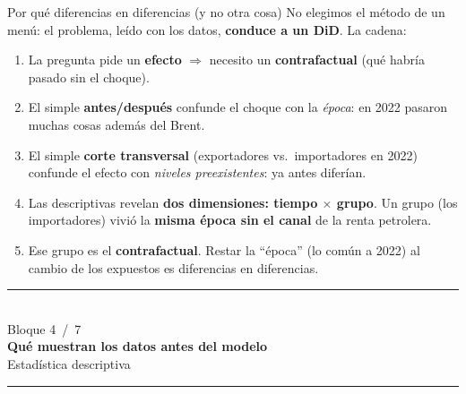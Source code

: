 \documentclass[aspectratio=169,10pt]{beamer}
\newcommand{\key}[1]{{\bfseries\color{AcentoRojo}#1}}
\newcommand{\divisor}[3]{%
  {\setbeamertemplate{footline}{}%
   \begin{frame}[plain]
     \vfill
     \begin{center}
       {\color{AcentoRojo}\rule{2.6cm}{1.2pt}}\\[0.7em]
       {\scriptsize\color{GrisMedio}Bloque #1 \,/\, 7}\\[0.6em]
       {\Large\color{Carbon}\bfseries #2}\\[0.45em]
       {\color{GrisMedio}#3}\\[0.7em]
       {\color{AcentoRojo}\rule{2.6cm}{1.2pt}}
     \end{center}
     \vfill
   \end{frame}}}
\begin{document}
\begin{frame}{Por qué diferencias en diferencias (y no otra cosa)}
  \small
  No elegimos el método de un menú: el problema, leído con los datos, \textbf{conduce a un DiD}.
  La cadena:
  \begin{enumerate}
    \item La pregunta pide un \textbf{efecto} $\Rightarrow$ necesito un \textbf{contrafactual}
          (qué habría pasado sin el choque).
    \item El simple \textbf{antes/después} confunde el choque con la \emph{época}: en 2022 pasaron
          muchas cosas además del Brent.
    \item El simple \textbf{corte transversal} (exportadores vs.\ importadores en 2022) confunde el
          efecto con \emph{niveles preexistentes}: ya antes diferían.
    \item Las descriptivas revelan \key{dos dimensiones: tiempo $\times$ grupo}. Un grupo (los
          importadores) vivió la \textbf{misma época sin el canal} de la renta petrolera.
    \item Ese grupo es el \textbf{contrafactual}. Restar la ``época'' (lo común a 2022) al cambio
          de los expuestos \alert{es diferencias en diferencias}.
  \end{enumerate}

\end{frame}

\divisor{4}{Qué muestran los datos antes del modelo}{Estadística descriptiva}
\end{document}
